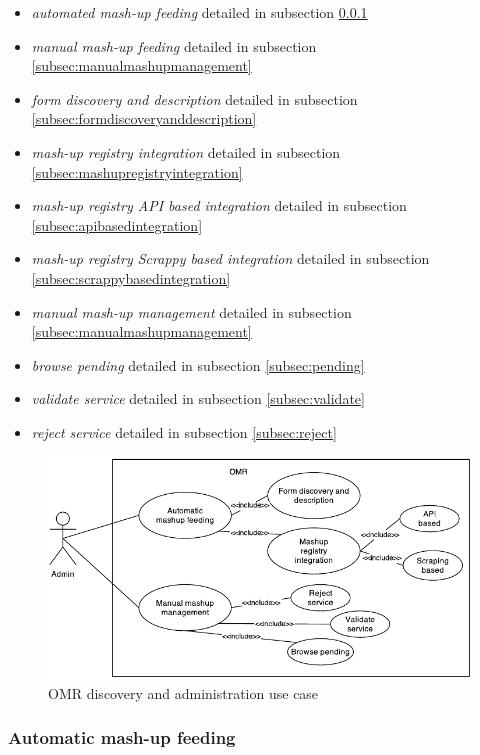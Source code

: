 \begin{itemize}
\item \textit{automated mash-up feeding} detailed in subsection \ref{subsec:automatedmashupfeeding}
\item \textit{manual mash-up feeding} detailed in subsection \ref{subsec:manualmashupmanagement}
\item \textit{form discovery and description} detailed in subsection \ref{subsec:formdiscoveryanddescription}
\item \textit{mash-up registry integration} detailed in subsection \ref{subsec:mashupregistryintegration}
\item \textit{mash-up registry API based integration} detailed in subsection \ref{subsec:apibasedintegration}
\item \textit{mash-up registry Scrappy based integration} detailed in subsection \ref{subsec:scrappybasedintegration}
\item \textit{manual mash-up management} detailed in subsection \ref{subsec:manualmashupmanagement}
\item \textit{browse pending} detailed in subsection \ref{subsec:pending}
\item \textit{validate service} detailed in subsection \ref{subsec:validate}
\item \textit{reject service} detailed in subsection \ref{subsec:reject}
\end{itemize}

\begin{figure}[h]
\centering
\includegraphics[width=400pt]{graphics/uc2.pdf}
\caption{OMR discovery and administration use case}
\label{fig:pack-uc2}
\end{figure}

\FloatBarrier

\newpage
\subsubsection{Automatic mash-up feeding}
\label{subsec:automatedmashupfeeding}

